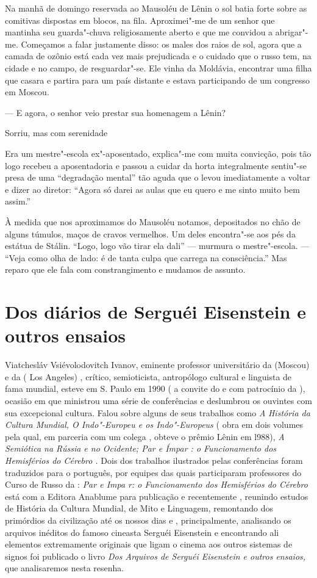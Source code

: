 Na manhã de domingo reservada ao Mausoléu de Lênin o sol batia forte
sobre as comitivas dispostas em blocos, na fila. Aproximei"-me de um
senhor que mantinha seu guarda"-chuva religiosamente aberto e que me
convidou a abrigar"-me. Começamos a falar justamente disso: os males dos
raios de sol, agora que a camada de ozônio está cada vez mais
prejudicada e o cuidado que o russo tem, na cidade e no campo, de
resguardar"-se. Ele vinha da Moldávia, encontrar uma filha que casara e
partira para um país distante e estava participando de um congresso em
Moscou.

--- E agora, o senhor veio prestar sua homenagem a Lênin?

Sorriu, mas com serenidade

Era um mestre"-escola ex"-aposentado, explica"-me com muita convicção, pois
tão logo recebeu a aposentadoria e passou a cuidar da horta
integralmente sentiu"-se presa de uma ``degradação mental'' tão aguda que
o levou imediatamente a voltar e dizer ao diretor: ``Agora só darei as
aulas que eu quero e me sinto muito bem assim.''

À medida que nos aproximamos do Mausoléu notamos, depositados no chão de
alguns túmulos, maços de cravos vermelhos. Um deles encontra"-se aos pés
da estátua de Stálin. ``Logo, logo vão tirar ela dali'' --- murmura o
mestre"-escola. --- ``Veja como olha de lado: é de tanta culpa que carrega
na consciência.'' Mas reparo que ele fala com constrangimento e mudamos
de assunto.

\chapter{Dos diários de Serguéi Eisenstein e outros ensaios}

Viatchesláv Vsiévolodovitch Ivanov, eminente professor universitário da
 (Moscou) e da  ( Los Angeles) , crítico, semioticista,
antropólogo cultural e linguista de fama mundial, esteve em S. Paulo em
1990 ( a convite do  e com patrocínio da ), ocasião em que
ministrou uma série de conferências e deslumbrou os ouvintes com sua
excepcional cultura. Falou sobre alguns de seus trabalhos como \emph{A}
\emph{História da Cultura Mundial, O Indo"-Europeu e os Indo"-Europeus} (
obra em dois volumes pela qual, em parceria com um colega , obteve o
prêmio Lênin em l988), \emph{A Semiótica na Rússia e no Ocidente; Par e
Ímpar : o Funcionamento dos Hemisférios do Cérebro .} Dois dos trabalhos
ilustrados pelas conferências foram traduzidos para o português, por
equipes das quais participaram professores do Curso de Russo da :
\emph{Par e Impa r: o Funcionamento dos Hemisférios do Cérebro} está com
a Editora Anablume para publicação e recentemente , reunindo estudos de
História da Cultura Mundial, de Mito e Linguagem, remontando dos
primórdios da civilização até os nossos dias e , principalmente,
analisando os arquivos inéditos do famoso cineasta Serguéi Eisenstein e
encontrando ali elementos extremamente originais que ligam o cinema aos
outros sistemas de signos foi publicado o livro \emph{Dos Arquivos de
Serguéi Eisenstein e outros ensaios,} que analisaremos nesta resenha.

